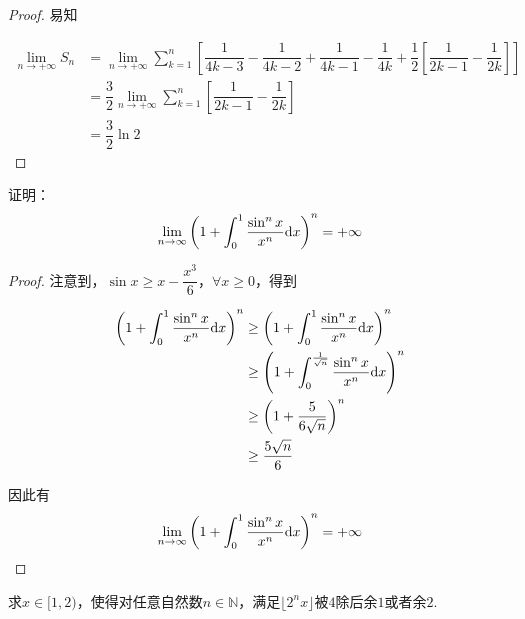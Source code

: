 \begin{proof}

    易知
    
    \begin{align*}
        \lim\limits_{n \to +\infty } S_{n} & =  \lim\limits_{n \to +\infty} \sum\limits_{k = 1}^{n} \left[ \dfrac{1}{4k - 3} - \dfrac{1}{4k - 2} + \dfrac{1}{4k - 1} - \dfrac{1}{4k}  + \dfrac{1}{2} \left[ \dfrac{1}{2k - 1} - \dfrac{1}{2k} \right] \right] \\
        & = \dfrac{3}{2} \lim\limits_{n \to + \infty} \sum\limits_{k = 1}^{n}  \left[  \dfrac{1}{2k - 1} -\dfrac{1}{2k} \right] \\
        & = \dfrac{3}{2} \ln 2
    \end{align*}

\end{proof}

\begin{proposition}

    证明：
    $$\lim\limits_{n \to \infty}{\left( 1 + \int_{0}^{1}{\dfrac{\sin^n{x}}{x^n}}\mathrm{d} x \right)^n} = + \infty$$

\end{proposition}

\begin{proof}

    注意到，$\sin{x} \geq x - \dfrac{x^3}{6}$，$\forall x \geq 0$，得到

    \begin{align*}
        \left( 1 + \int_{0}^{1}{\dfrac{\sin^n{x}}{x^n}}\mathrm{d} x \right)^n & \geq \left( 1 + \int_{0}^{1}{\dfrac{\sin^n x}{x^n}}\mathrm{d} x \right)^n \\
        & \geq \left( 1 + \int_{0}^{\frac{1}{\sqrt{n}}}{\dfrac{\sin^n{x}}{x^n}}\mathrm{d} x \right)^n \\
        & \geq \left( 1 + \dfrac{5}{6\sqrt{n}} \right)^n \\
        & \geq \dfrac{5\sqrt{n}}{6}
    \end{align*}

    因此有
    $$\lim\limits_{n \to \infty}{\left( 1 + \int_{0}^{1}{\dfrac{\sin^n{x}}{x^n}}\mathrm{d} x \right)^n} = + \infty$$

\end{proof}

\begin{proposition}

    求$x \in [1, 2)$，使得对任意自然数$n \in \mathbb{N}$，满足$\lfloor 2^n x \rfloor$被$4$除后余$1$或者余$2$.

\end{proposition}

